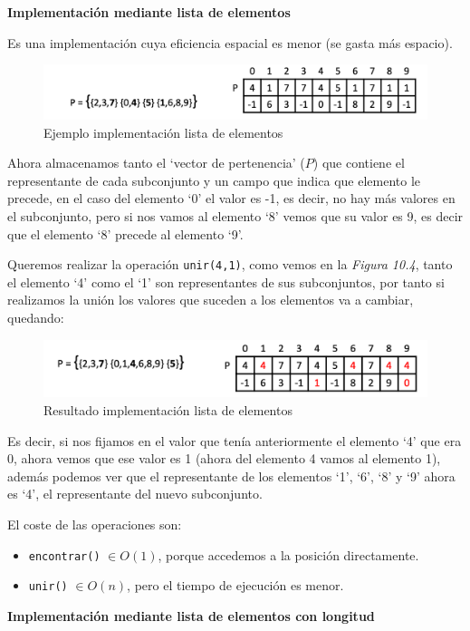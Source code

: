 \textbf{Implementación mediante lista de elementos}

Es una implementación cuya eficiencia espacial es menor (se gasta más espacio).

\begin{figure}[h]
  \begin{center}
    \includegraphics[width=\textwidth]{assets/impPAR3.png}
  \end{center}
  \caption{Ejemplo implementación lista de elementos}
\end{figure}

Ahora almacenamos tanto el `vector de pertenencia' (\(P\)) que contiene el representante de cada subconjunto y un campo que indica que elemento le precede, en el caso del elemento `0' el valor es -1, es decir, no hay más valores en el subconjunto, pero si nos vamos al elemento `8' vemos que su valor es 9, es decir que el elemento `8' precede al elemento `9'.

Queremos realizar la operación \texttt{unir(4,1)}, como vemos en la \textit{Figura 10.4}, tanto el elemento `4' como el `1' son representantes de sus subconjuntos, por tanto si realizamos la unión los valores que suceden a los elementos va a cambiar, quedando:
\begin{figure}[h]
  \begin{center}
    \includegraphics[width=\textwidth]{assets/impPAR4.png}
  \end{center}
  \caption{Resultado implementación lista de elementos}
\end{figure}

Es decir, si nos fijamos en el valor que tenía anteriormente el elemento `4' que era 0, ahora vemos que ese valor es 1 (ahora del elemento 4 vamos al elemento 1), además podemos ver que el representante de los elementos `1', `6', `8' y `9' ahora es `4', el representante del nuevo subconjunto.

El coste de las operaciones son:
\begin{itemize}
  \item \texttt{encontrar()} \(\in O(1)\), porque accedemos a la posición directamente.
  \item \texttt{unir()} \(\in O(n)\), pero el tiempo de ejecución es menor.
\end{itemize}
\newpage
\textbf{Implementación mediante lista de elementos con longitud}

